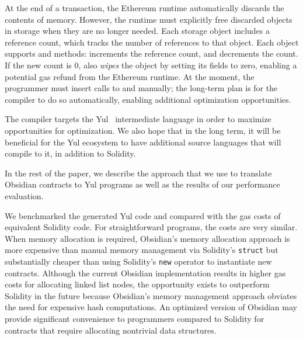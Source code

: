 At the end of a transaction, the Ethereum runtime automatically discards the contents of memory. However, the runtime must explicitly free discarded objects in storage when they are no longer needed. Each storage object includes a reference count, which tracks the number of references to that object. Each object supports  and  methods:  increments the reference count, and  decrements the count. If the new count is 0,  also \emph{wipes} the object by setting its fields to zero, enabling a potential gas refund from the Ethereum runtime. At the moment, the programmer must insert calls to  and  manually; the long-term plan is for the compiler to do so automatically, enabling additional optimization opportunities. 

The compiler targets the Yul~\cite{Yul} intermediate language in order to maximize opportunities for optimization. We also hope that in the long term, it will be beneficial for the Yul ecosystem to have additional source languages that will compile to it, in addition to Solidity.

In the rest of the paper, we describe the approach that we use to translate Obsidian contracts to Yul programs as well as the results of our performance evaluation.

We benchmarked the generated Yul code and compared with the gas costs of equivalent Solidity code. 	For straightforward programs, the costs are very similar. When memory allocation is required, Obsidian's memory allocation approach is more expensive than manual memory management via Solidity's \texttt{struct} but substantially cheaper than using Solidity's \texttt{new} operator to instantiate new contracts. Although the current Obsidian implementation results in higher gas costs for allocating linked list nodes, the opportunity exists to outperform Solidity in the future because Obsidian's memory management approach obviates the need for expensive hash computations. An optimized version of Obsidian may provide significant convenience to programmers compared to Solidity for contracts that require allocating nontrivial data structures.